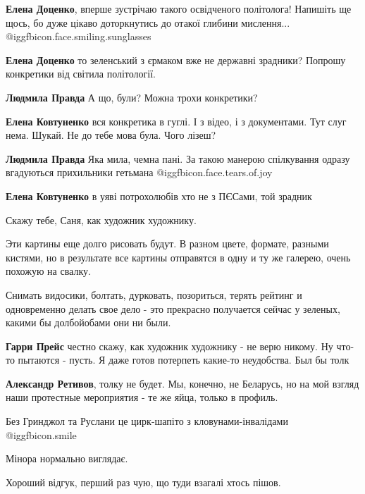 \begin{itemize}
\begin{itemize}
\textbf{Елена Доценко}, вперше зустрічаю такого освідченого політолога!
Напишіть ще щось, бо дуже цікаво доторкнутись до отакої глибини мислення...  @igg{fbicon.face.smiling.sunglasses} 

\textbf{Елена Доценко} то зеленський з єрмаком вже не державні зрадники? Попрошу конкретики від світила політології.

\textbf{Людмила Правда} А що, були? Можна трохи конкретики?

\textbf{Елена Ковтуненко} вся конкретика в гуглі. І з відео, і з документами. Тут слуг нема. Шукай. Не до тебе мова була. Чого лізеш?

\textbf{Людмила Правда} Яка мила, чемна пані. За такою манерою спілкування одразу вгадуються прихильники гетьмана  @igg{fbicon.face.tears.of.joy} 

\textbf{Елена Ковтуненко} в уяві потрохолюбів хто не з ПЄСами, той зрадник
\end{itemize} %


Скажу тебе, Саня, как художник художнику.

Эти картины еще долго рисовать будут. В разном цвете, формате, разными кистями,
но в результате все картины отправятся в одну и ту же галерею, очень похожую на
свалку.

Снимать видосики, болтать, дурковать, позориться, терять рейтинг и одновременно
делать свое дело - это прекрасно получается сейчас у зеленых, какими бы
долбойобами они ни были.

\begin{itemize} %
\textbf{Гарри Прейс} честно скажу, как художник художнику - не верю никому. Ну что-то пытаются - пусть. Я даже готов потерпеть какие-то неудобства. Был бы толк

\textbf{Александр Ретивов}, толку не будет.
Мы, конечно, не Беларусь, но на мой взгляд наши протестные мероприятия - те же яйца, только в профиль.
\end{itemize} %

Без Гринджол та Руслани це цирк-шапіто з кловунами-інвалідами  @igg{fbicon.smile} 

Мінора нормально виглядає.

Хороший відгук, перший раз чую, що туди взагалі хтось пішов.


\end{itemize}
